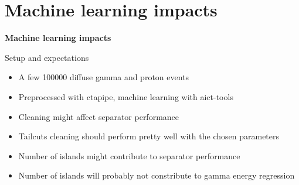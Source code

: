 
\section{Machine learning impacts}

\begin{frame}
    \centering
    {\Huge \textbf{Machine learning impacts}}
\end{frame}

\begin{frame}{Setup and expectations}
    \begin{itemize}
        \item A few \num{100000} diffuse gamma and proton events
        \item Preprocessed with ctapipe, machine learning with aict-tools \cite{Anderhub_2013}
        \item Cleaning might affect separator performance
        \item Tailcuts cleaning should perform pretty well with the chosen parameters
        \item Number of islands might contribute to separator performance
        \item Number of islands will probably not constribute to gamma energy regression
    \end{itemize}
\end{frame}

